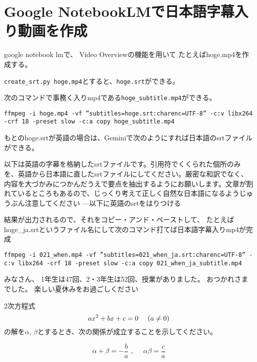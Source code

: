 \documentclass[12pt,jafontscale=0.9247]{jlreq}
\begin{document}
\newpage
\section*{Google NotebookLMで日本語字幕入り動画を作成}


google notebook lmで、
Video Overviewの機能を用いて
たとえばhoge.mp4を作成する。


\verb|create_srt.py hoge.mp4|とすると、\verb|hoge.srt|ができる。

次のコマンドで事務く入りmp4である\verb|hoge_subtitle.mp4|ができる。

\begin{verbatim}
ffmpeg -i hoge.mp4 -vf ”subtitles=hoge.srt:charenc=UTF-8” -c:v libx264 -crf 18 -preset slow -c:a copy hoge_subtitle.mp4
\end{verbatim}
もとのhoge.srtが英語の場合は、Geminiで次のようにすれば日本語のsrtファイルができる。
\begin{tcolorbox}
 以下は英語の字幕を格納したsrtファイルです。引用符でくくられた個所のみを、英語から日本語に直したsrtファイルにしてください。厳密な和訳でなく、内容を大づかみにつかんだうえで要点を抽出するようにお願いします。文章が割れているところもあるので、じっくり考えて正しく自然な日本語になるようじゅうぶん注意してください
---以下に英語のsrtをはりつける
\end{tcolorbox}

結果が出力されるので、それをコピー・アンド・ペーストして、
たとえばhoge\_ja.srtというファイル名にして次のコマンド打てば日本語字幕入りmp4が完成

\begin{verbatim}
ffmpeg -i 021_when.mp4 -vf ”subtitles=021_when_ja.srt:charenc=UTF-8” -c:v libx264 -crf 18 -preset slow -c:a copy 021_when_ja_subtitle.mp4
\end{verbatim}

\newpage
\vfill

{\gtfamily\bfseries

みなさん、
1年生は47回、2・3年生は52回、授業がありました。
おつかれさまでした。
楽しい夏休みをお過ごしください
}

%


2次方程式
\[
 ax^2+bx+c=0\,\,\,\,\,\,\,\,\text(a\neq{}0\text)
\]
の解を$\alpha$, $\beta$とするとき、次の関係が成立することを示してください。

\begin{tcolorbox}
 \[
 \alpha + \beta = -\frac{b}{a}\,\,,\,\,\,\,\,\,\,\,\alpha\beta = \frac{c}{a}
\]

\end{tcolorbox}
\end{document}
